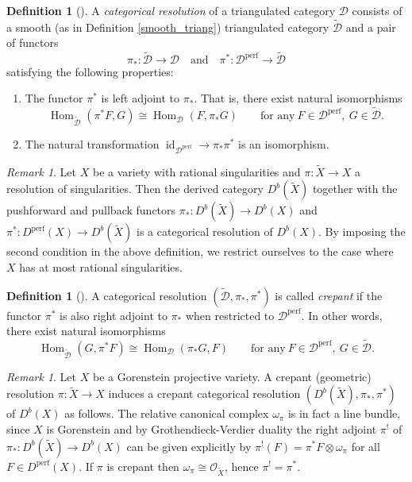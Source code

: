 \documentclass[a4paper, twoside, 11pt]{amsart}
\theoremstyle{definition}
\newtheorem{definition}[theorem]{Definition}
\theoremstyle{remark}
\newtheorem{remark}[theorem]{Remark}
\numberwithin{equation}{theorem}
\DeclareMathOperator{\Hom}{Hom}
\DeclareMathOperator{\id}{id}
\DeclareMathOperator{\lilperf}{perf}
\newcommand{\regD}{\widetilde{\mathcal{D}}}
\newcommand{\dbx}{D^b(X)}
\newcommand{\perf}{\mathcal{D}^{\text{perf}}}
\begin{document}
\begin{definition}[{\cite[Definition 3.2]{Lefschetz_Decomp}}] \label{catresdefi}
	A \textit{categorical resolution} of a triangulated category $\mathcal{D}$ consists of a smooth (as in Definition \ref{smooth_triang}) triangulated category $\regD$ and a pair of functors 
	\begin{equation*}
		\pi_*\colon \regD \to \mathcal{D} \quad \text{and} \quad \pi^*\colon \perf \to \regD
	\end{equation*}
	satisfying the following properties:
	\begin{enumerate}
		\item The functor $\pi^*$ is left adjoint to $\pi_*$. That is, there exist natural isomorphisms
		\begin{equation*}
			\Hom_{\regD}(\pi^*F, G) \cong \Hom_{\mathcal{D}}(F,\pi_*G) \quad \quad \text{for any} \ F\in \perf, \ G \in \regD. 
		\end{equation*}
		\item The natural transformation $\id_{\perf} \to \pi_*\pi^*$ is an isomorphism.
	\end{enumerate}
\end{definition}
\begin{remark}
	Let $X$ be a variety with rational singularities and $\pi\colon \widetilde{X} \to X$ a resolution of singularities. Then the derived category $D^b(\widetilde{X})$ together with the pushforward and pullback functors $\pi_*\colon D^b(\widetilde{X}) \to \dbx$ and $\pi^*\colon D^{\lilperf}(X) \to D^b(\widetilde{X})$ is a categorical resolution of $\dbx$. 
	By imposing the second condition in the above definition, we restrict ourselves to the case where $X$ has at most rational singularities.
\end{remark}
\begin{definition}[{\cite[Definition 3.4]{Lefschetz_Decomp}}] \label{crepcatresdefi}
	A categorical resolution $(\widetilde{\mathcal{D}}, \pi_*,\pi^*)$ is called  \textit{crepant} if the functor $\pi^*$ is also right adjoint to $\pi_*$ when restricted to $\perf$. In other words, there exist natural isomorphisms
	\begin{equation*}
		\Hom_{\regD}(G, \pi^*F) \cong \Hom_{\mathcal{D}}(\pi_*G, F) \quad \quad \text{for any} \ F\in \perf, \ G \in \regD.
	\end{equation*}
\end{definition}
\begin{remark}\label{crepancy_GVD}
	Let $X$ be a Gorenstein projective variety. A  crepant (geometric) resolution $\pi\colon \widetilde{X} \to X$ induces a crepant categorical resolution $(D^b(\widetilde{X}), \pi_*, \pi^*)$ of $\dbx$ as follows. The relative canonical complex $\omega_{\pi}$ is in fact a line bundle, since $X$ is Gorenstein and by Grothendieck-Verdier duality the right adjoint $\pi^!$ of $\pi_*\colon D^b(\widetilde{X}) \to \dbx$ can be given explicitly by $\pi^!(F) = \pi^*F \otimes \omega_\pi$ for all $F \in D^{\lilperf}(X)$. If $\pi$ is crepant then $\omega_\pi \cong \mathcal{O}_{\widetilde{X}}$, hence $\pi^! = \pi^*$.
\end{remark}
\end{document}
